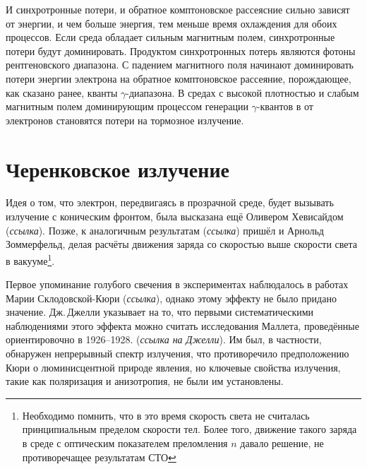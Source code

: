 \documentclass[magd,floatypics,numeref]{msudipl} %
\begin{document}
И синхротронные потери, и обратное комптоновское рассеясние сильно зависят от энергии, и чем больше энергия, тем меньше время охлаждения для обоих процессов.  Если среда обладает сильным магнитным полем, синхротронные потери будут доминировать. Продуктом синхротронных потерь являются фотоны рентгеновского диапазона. С падением магнитного поля начинают доминировать потери энергии электрона на обратное комптоновское рассеяние, порождающее, как сказано ранее, кванты $\gamma$-диапазона. 
В средах с высокой плотностью и слабым магнитным полем доминирующим процессом генерации $\gamma$-квантов в от электронов становятся потери на тормозное излучение. 
\section{Черенковское излучение}
Идея о том, что электрон, передвигаясь в прозрачной среде, будет вызывать излучение с коническим фронтом, была высказана ещё Оливером Хевисайдом (\textit{ссылка}).
Позже, к аналогичным результатам (\textit{ссылка}) пришёл и Арнольд Зоммерфельд, делая расчёты движения заряда со скоростью выше скорости света в вакууме\footnote{Необходимо помнить, что в это время скорость света не считалась принципиальным пределом скорости тел. Более того, движение такого заряда в среде с оптическим показателем преломления $n$ давало решение, не противоречащее результатам СТО}. 

Первое упоминание голубого свечения в экспериментах наблюдалось в работах Марии Склодовской-Кюри (\textit{ссылка}), однако этому эффекту не было придано значение. Дж.\,Джелли указывает на то, что первыми систематическими наблюдениями этого эффекта можно считать исследования Маллета, проведённые ориентировочно в 1926--1928. (\textit{ссылка на Джелли}). Им был, в частности, обнаружен непрерывный спектр излучения, что противоречило предположению Кюри о люминисцентной природе явления, но ключевые свойства излучения, такие как поляризация и анизотропия, не были им установлены. 
\end{document}

